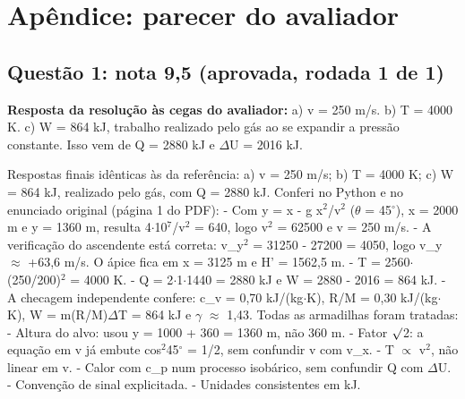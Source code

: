 \documentclass{article}%
\begin{document}
\section*{Apêndice: parecer do avaliador}%
\subsection*{Questão 1: nota 9,5 (aprovada, rodada 1 de 1)}%
\textbf{Resposta da resolução às cegas do avaliador:} a) v = 250 m/s. b) T = 4000 K. c) W = 864 kJ, trabalho realizado pelo gás ao se expandir a pressão constante. Isso vem de Q = 2880 kJ e $\Delta$U = 2016 kJ.\par %
Respostas finais idênticas às da referência: a) v = 250 m/s; b) T = 4000 K; c) W = 864 kJ, realizado pelo gás, com Q = 2880 kJ.\newline%
\newline%
Conferi no Python e no enunciado original (página 1 do PDF):\newline%
{-} Com y = x - g x$^2$/v$^2$ ($\theta$ = 45$^\circ$), x = 2000 m e y = 1360 m, resulta 4$\cdot$10$^{7}$/v$^2$ = 640, logo v$^2$ = 62500 e v = 250 m/s.\newline%
{-} A verificação do ascendente está correta: v\_y$^2$ = 31250 - 27200 = 4050, logo v\_y $\approx$ +63,6 m/s. O ápice fica em x = 3125 m e H' = 1562,5 m.\newline%
{-} T = 2560$\cdot$(250/200)$^2$ = 4000 K.\newline%
{-} Q = 2$\cdot$1$\cdot$1440 = 2880 kJ e W = 2880 - 2016 = 864 kJ.\newline%
{-} A checagem independente confere: c\_v = 0,70 kJ/(kg$\cdot$K), R/M = 0,30 kJ/(kg$\cdot$K), W = m(R/M)$\Delta$T = 864 kJ e $\gamma$ $\approx$ 1,43.\newline%
\newline%
Todas as armadilhas foram tratadas:\newline%
{-} Altura do alvo: usou y = 1000 + 360 = 1360 m, não 360 m.\newline%
{-} Fator $\surd$2: a equação em v já embute cos$^2$45$^\circ$ = 1/2, sem confundir v com v\_x.\newline%
{-} T $\propto$ v$^2$, não linear em v.\newline%
{-} Calor com c\_p num processo isobárico, sem confundir Q com $\Delta$U.\newline%
{-} Convenção de sinal explicitada.\newline%
{-} Unidades consistentes em kJ.\newline%
\newline%
\end{document}
